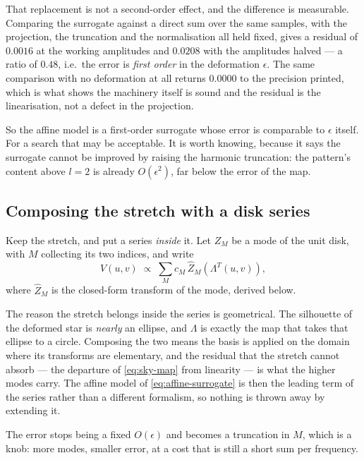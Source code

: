 That replacement is not a second-order effect, and the difference is measurable.  Comparing
the surrogate against a direct sum over the same samples, with the projection, the
truncation and the normalisation all held fixed, gives a residual of $0.0016$ at the
working amplitudes and $0.0208$ with the amplitudes halved --- a ratio of $0.48$, i.e.\ the
error is \emph{first order} in the deformation $\epsilon$.  The same comparison with no
deformation at all returns $0.0000$ to the precision printed, which is what shows the
machinery itself is sound and the residual is the linearisation, not a defect in the
projection.

So the affine model is a first-order surrogate whose error is comparable to $\epsilon$
itself.  For a search that may be acceptable.  It is worth knowing, because it says the
surrogate cannot be improved by raising the harmonic truncation: the pattern's content above
$l = 2$ is already $O(\epsilon^2)$, far below the error of the map.

\subsection{Composing the stretch with a disk series}
\label{sec:disk-modes-composition}

Keep the stretch, and put a series \emph{inside} it.  Let $Z_M$ be a mode of the unit disk,
with $M$ collecting its two indices, and write
\begin{equation}
  V(u,v) \;\propto\; \sum_M c_M\,\widehat{Z}_M\!\left(\Lambda^{T}(u,v)\right) ,
  \label{eq:disk-mode-series}
\end{equation}
where $\widehat{Z}_M$ is the closed-form transform of the mode, derived below.

The reason the stretch belongs inside the series is geometrical.  The silhouette of the
deformed star is \emph{nearly} an ellipse, and $\Lambda$ is exactly the map that takes that
ellipse to a circle.  Composing the two means the basis is applied on the domain where its
transforms are elementary, and the residual that the stretch cannot absorb --- the departure
of \eqref{eq:sky-map} from linearity --- is what the higher modes carry.  The affine model
of \eqref{eq:affine-surrogate} is then the leading term of the series rather than a
different formalism, so nothing is thrown away by extending it.

The error stops being a fixed $O(\epsilon)$ and becomes a truncation in $M$, which is a
knob: more modes, smaller error, at a cost that is still a short sum per frequency.

